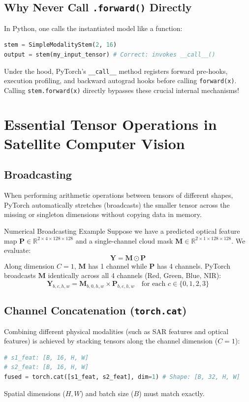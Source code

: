 \subsection{Why Never Call \texttt{.forward()} Directly}
In Python, one calls the instantiated model like a function:
\begin{lstlisting}[language=Python]
stem = SimpleModalityStem(2, 16)
output = stem(my_input_tensor) # Correct: invokes __call__()
\end{lstlisting}
Under the hood, PyTorch's \texttt{\_\_call\_\_} method registers forward pre-hooks, execution profiling, and backward autograd hooks before calling \texttt{forward(x)}. Calling \texttt{stem.forward(x)} directly bypasses these crucial internal mechanisms!

\section{Essential Tensor Operations in Satellite Computer Vision}

\subsection{Broadcasting}
When performing arithmetic operations between tensors of different shapes, PyTorch automatically stretches (broadcasts) the smaller tensor across the missing or singleton dimensions without copying data in memory.
\begin{mathbox}{Numerical Broadcasting Example}
Suppose we have a predicted optical feature map $\mathbf{P} \in \mathbb{R}^{2 \times 4 \times 128 \times 128}$ and a single-channel cloud mask $\mathbf{M} \in \mathbb{R}^{2 \times 1 \times 128 \times 128}$.
We evaluate:
\[
\mathbf{Y} = \mathbf{M} \odot \mathbf{P}
\]
Along dimension $C=1$, $\mathbf{M}$ has 1 channel while $\mathbf{P}$ has 4 channels. PyTorch broadcasts $\mathbf{M}$ identically across all 4 channels (Red, Green, Blue, NIR):
\[
\mathbf{Y}_{b, c, h, w} = \mathbf{M}_{b, 0, h, w} \times \mathbf{P}_{b, c, h, w} \quad \text{for each } c \in \{0, 1, 2, 3\}
\]
\end{mathbox}

\subsection{Channel Concatenation (\texttt{torch.cat})}
Combining different physical modalities (such as SAR features and optical features) is achieved by stacking tensors along the channel dimension ($C=1$):
\begin{lstlisting}[language=Python]
# s1_feat: [B, 16, H, W]
# s2_feat: [B, 16, H, W]
fused = torch.cat([s1_feat, s2_feat], dim=1) # Shape: [B, 32, H, W]
\end{lstlisting}
Spatial dimensions ($H, W$) and batch size ($B$) must match exactly.


